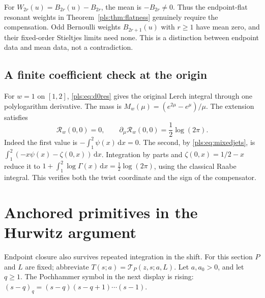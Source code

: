 \documentclass[11pt,letterpaper]{article}
\numberwithin{equation}{section}
\theoremstyle{definition}
\theoremstyle{remark}\newtheorem{remark}[theorem]{Remark}
\newcommand{\dd}{\,\mathrm d}
\newcommand{\T}{\mathcal T}
\begin{document}
For $W_{2r}(u)=B_{2r}(u)-B_{2r}$, the mean is $-B_{2r}\ne0$.
Thus the endpoint-flat resonant weights in
Theorem~\ref{pls:thm:flatness} genuinely require the compensation.
Odd Bernoulli weights $B_{2r+1}(u)$ with $r\ge1$ have mean zero,
and their fixed-order Stieltjes limits need none. This is a distinction
between endpoint data and mean data, not a contradiction.

\subsection{A finite coefficient check at the origin}

For $w=1$ on $[1,2]$, \eqref{pls:eq:d0res} gives the original
Lerch integral through one polylogarithm derivative. The mass is
$M_w(\mu)=(e^{2\mu}-e^\mu)/\mu$. The extension satisfies
\begin{equation}\label{pls:eq:originexample}
 \mathscr R_w(0,0)=0,\qquad
 \partial_\mu\mathscr R_w(0,0)=\frac12\log(2\pi).
\end{equation}
Indeed the first value is
$-\int_1^2\psi(x)\dd x=0$. The second, by
\eqref{pls:eq:mixedjets}, is
$\int_1^2(-x\psi(x)-\zeta(0,x))\dd x$.
Integration by parts and $\zeta(0,x)=1/2-x$ reduce it to
$1+\int_1^2\log\Gamma(x)\dd x=\tfrac12\log(2\pi)$,
using the classical Raabe integral. This verifies both the twist
coordinate and the sign of the compensator.

\section{Anchored primitives in the Hurwitz argument}
\label{pls:sec:primitives}

Endpoint closure also survives repeated integration in the shift.
For this section $P$ and $L$ are fixed; abbreviate
$T(s;a)=\T_P(z,s;a,L)$. Let $a,a_0>0$, and let $q\ge1$.
The Pochhammer symbol in the next display is rising:
$(s-q)_q=(s-q)(s-q+1)\cdots(s-1)$.
\end{document}
